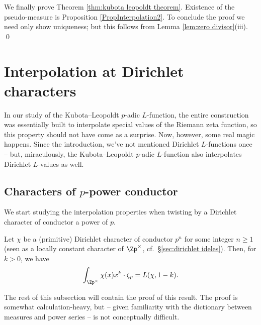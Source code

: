 \documentclass[a4paper,10pt, english, reqno]{smfart}
\numberwithin{equation}{section}
\begin{document}
We finally prove Theorem \ref{thm:kubota leopoldt theorem}. Existence of the pseudo-measure is Proposition \ref{PropInterpolation2}. To conclude the proof we need only show uniqueness; but this follows from  Lemma \ref{lem:zero divisor}(iii). \qed








\section{Interpolation at Dirichlet characters}\label{interpolation}

In our study of the Kubota--Leopoldt $p$-adic $L$-function, the entire construction was essentially built to interpolate special values of the Riemann zeta function, so this property should not have come as a surprise. Now, however, some real magic happens. Since the introduction, we've not mentioned Dirichlet $L$-functions once -- but, miraculously, the Kubota--Leopoldt $p$-adic $L$-function also interpolates Dirichlet $L$-values as well.

\subsection{Characters of $p$-power conductor}


We start studying the interpolation properties when twisting by a Dirichlet character of conductor a power of $p$.

\begin{theorem}\label{thm:tame conductor}
Let $\chi$ be a (primitive) Dirichlet character of conductor $p^n$ for some integer $n \geq 1$ (seen as a locally constant character of $\Zp^\times$, cf.\ \S \ref{sec:dirichlet ideles}). Then, for $k > 0$, we have
\[ \int_{\Zp^\times}\chi(x)x^k \cdot\zeta_p = L(\chi,1-k).\]
\end{theorem}
The rest of this subsection will contain the proof of this result. The proof is somewhat calculation-heavy, but -- given familiarity with the dictionary between measures and power series -- is not conceptually difficult. 
\end{document}

